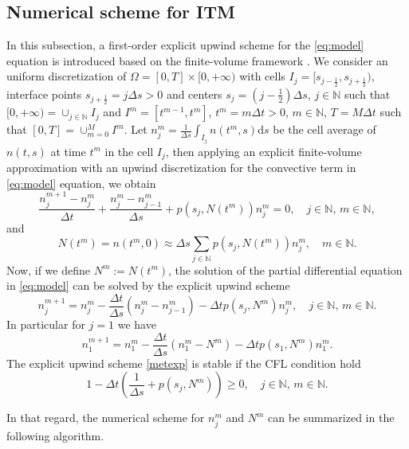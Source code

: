 \documentclass[11pt,a4paper]{article}
\newcommand{\N}{\mathbb{N}}
\newcommand{\dd}{\mathrm{d}}
\begin{document}
\subsection{Numerical scheme for ITM}
In this subsection, a first-order explicit upwind scheme for the \eqref{eq:model} equation is introduced based on the finite-volume framework \cite{leveque1992numerical,godlewski1996numerical,bouchut2004nonlinear}. We consider an uniform discretization of $\Omega=[0,T]\times[0,+\infty)$   with cells $I_j=[s_{j-\frac12},s_{j+\frac12})$,  interface points $s_{j+\frac12}=j\Delta s>0$ and centers $s_j=(j-\frac12)\Delta s$, $j\in\N$ such that $[0,+\infty)=\cup_{j\in\N}I_j$ and $I^m=[t^{m-1},t^{m}]$, $t^{m}=m\Delta t>0$, $m\in\N$, $T=M\Delta t$ such that $[0,T]=\cup_{m=0}^M I^m$. Let $n_j^m=\frac{1}{\Delta s}\int_{I_j}n(t^m,s)\dd s$ be the cell average of $n(t,s)$ at time $t^m$ in the cell $I_j$, then applying an explicit finite-volume approximation with an upwind discretization for the convective term in \eqref{eq:model} equation, we obtain 
\begin{equation}
\label{finit-diff}
    \frac{n_j^{m+1}-n_j^m}{\Delta t}+\frac{n_j^m-n_{j-1}^m}{\Delta s}+p(s_j,N(t^{m}))n_j^m=0,\quad j\in\N,\, m\in\N,
\end{equation}
and  
\begin{equation*}
    N(t^m)=n(t^m,0)\approx \Delta s \sum_{j\in\N} p(s_j,N(t^m))n_j^m,\quad m\in\N.
\end{equation*}
Now, if we define $N^m:=N(t^m)$, the solution of the partial differential equation in \eqref{eq:model} can be solved by the explicit upwind scheme
\begin{equation}\label{metexp}
    n_j^{m+1}=n_j^m-\frac{\Delta t}{\Delta s}(n_{j}^m-n_{j-1}^m)-\Delta t p(s_j,N^m)n_j^m,\quad j\in\N,\,m\in\N.
\end{equation}
In particular for $j=1$ we have
\begin{equation*} 
    n_1^{m+1}=n_1^m-\frac{\Delta t}{\Delta s}(n_{1}^m-N^m)-\Delta t p(s_1,N^m)n_1^m.
\end{equation*}
The explicit upwind scheme \eqref{metexp} is stable if the CFL condition hold
\begin{equation*}
    1-\Delta t\left( \frac{1}{\Delta s}+p(s_j,N^m) \right)\geq 0,\quad j\in\N,\,m\in\N.
\end{equation*}


In that regard, the numerical scheme for $n_j^m$ and $N^m$ can be summarized in the following algorithm.
\end{document}
